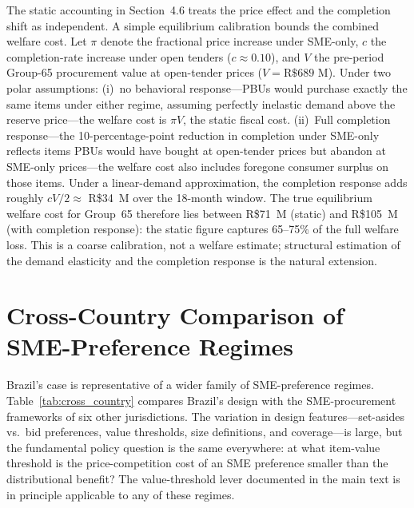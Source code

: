 \documentclass[12pt]{article}
\begin{document}
The static accounting in Section~4.6 treats the price effect and the completion shift as independent. A simple equilibrium calibration bounds the combined welfare cost. Let $\pi$ denote the fractional price increase under SME-only, $c$ the completion-rate increase under open tenders ($c \approx 0.10$), and $V$ the pre-period Group-65 procurement value at open-tender prices ($V = \text{R\$689~M}$). Under two polar assumptions: (i)~no behavioral response---PBUs would purchase exactly the same items under either regime, assuming perfectly inelastic demand above the reserve price---the welfare cost is $\pi V$, the static fiscal cost. (ii)~Full completion response---the 10-percentage-point reduction in completion under SME-only reflects items PBUs would have bought at open-tender prices but abandon at SME-only prices---the welfare cost also includes foregone consumer surplus on those items. Under a linear-demand approximation, the completion response adds roughly $cV/2 \approx$ R\$34~M over the 18-month window. The true equilibrium welfare cost for Group~65 therefore lies between R\$71~M (static) and R\$105~M (with completion response): the static figure captures 65--75\% of the full welfare loss. This is a coarse calibration, not a welfare estimate; structural estimation of the demand elasticity and the completion response is the natural extension.

\clearpage

\section{Cross-Country Comparison of SME-Preference Regimes}
\label{oa:cross_country}

Brazil's case is representative of a wider family of SME-preference regimes. Table~\ref{tab:cross_country} compares Brazil's design with the SME-procurement frameworks of six other jurisdictions. The variation in design features---set-asides vs.\ bid preferences, value thresholds, size definitions, and coverage---is large, but the fundamental policy question is the same everywhere: at what item-value threshold is the price-competition cost of an SME preference smaller than the distributional benefit? The value-threshold lever documented in the main text is in principle applicable to any of these regimes.
\end{document}
